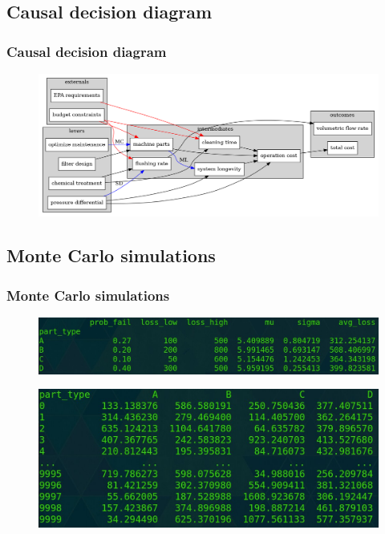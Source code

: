 \documentclass[
	11pt, %
]{beamer}
\begin{document}
\subsection{Causal decision diagram}

\begin{frame}
    \frametitle{Causal decision diagram}
	\begin{figure}
		\includegraphics[width=1.0\linewidth]{causal_decision_diagram.png}
	\end{figure}
\end{frame}


\subsection{Monte Carlo simulations}

\begin{frame}
    \frametitle{Monte Carlo simulations}
	\begin{figure}
		\includegraphics[width=1.0\linewidth]{machine_parts.jpg}
	\end{figure}
	\begin{figure}
	    \includegraphics[width=1.0\linewidth]
	    {projected_losses.jpg}
	\end{figure}
\end{frame}
\end{document}
